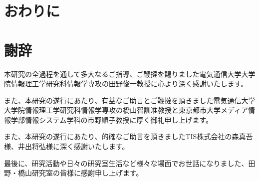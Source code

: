 \documentclass[11pt,a4j, titlepage]{jarticle} %
\begin{document}
\newpage
\section{おわりに}

\newpage
\section*{謝辞}
本研究の全過程を通して多大なるご指導、ご鞭撻を賜りました電気通信大学大学院情報理工学研究科情報学専攻の田野俊一教授に心より深く感謝いたします。

また、本研究の遂行にあたり、有益なご助言とご鞭撻を頂きました電気通信大学大学院情報理工学研究科情報学専攻の橋山智訓准教授と東京都市大学メディア情報学部情報システム学科の市野順子教授に厚く御礼申し上げます。

また、本研究の遂行にあたり、的確なご助言を頂きましたTIS株式会社の森真吾様、井出将弘様に深く感謝いたします。

最後に、研究活動や日々の研究室生活など様々な場面でお世話になりました、田野・橋山研究室の皆様に感謝申し上げます。
\end{document}
